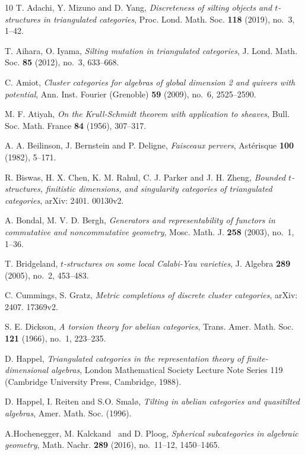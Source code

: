 \documentclass[11pt,a4paper]{amsart}
\numberwithin{equation}{section} \theoremstyle{plain}
\numberwithin{equation}{section} \theoremstyle{definition}
\begin{document}
\renewcommand\refname{\bf References}
\begin{thebibliography}{10}
T. Adachi, Y. Mizuno and D. Yang, \emph{Discreteness of silting objects and $t$-structures
in triangulated categories}, Proc. Lond. Math. Soc. \textbf{118} (2019), no.~3, 1--42.

T. Aihara, O. Iyama, \emph{Silting mutation in triangulated categories}, J. Lond. Math. Soc. \textbf{85} (2012), no.~3, 633--668.

C. Amiot, \emph{Cluster categories for algebras of global dimension 2 and quivers with potential}, Ann. Inst. Fourier (Grenoble) \textbf{59} (2009), no.~6, 2525--2590.

M. F. Atiyah, \emph{On the Krull-Schmidt theorem with application to sheaves}, Bull. Soc. Math. France \textbf{84} (1956), 307--317.

A. A. Beilinson, J. Bernstein and P. Deligne, \emph{Faisceaux pervers}, Ast\'{e}risque \textbf{100} (1982), 5--171.

R. Biswas, H. X. Chen, K. M. Rahul, C. J. Parker and J. H. Zheng, \emph{Bounded $t$-structures, finitistic dimensions, and singularity categories of triangulated categories}, arXiv: 2401. 00130v2.

A. Bondal, M. V. D. Bergh, \emph{Generators and representability of functors in commutative and noncommutative
geometry}, Mosc. Math. J. \textbf{258} (2003), no.~1, 1--36.

T. Bridgeland, \emph{$t$-structures on some local Calabi-Yau varieties}, J. Algebra \textbf{289} (2005), no.~2, 453--483.

C. Cummings, S. Gratz, \emph{Metric completions of discrete cluster categories}, arXiv: 2407. 17369v2.

S. E. Dickson, \emph{A torsion theory for abelian categories}, Trans. Amer. Math. Soc. \textbf{121} (1966), no.~1, 223--235.

D. Happel, \emph{Triangulated categories in the representation theory of finite-dimensional algebras}, London Mathematical Society Lecture Note Series 119 (Cambridge University Press, Cambridge, 1988).

D. Happel, I. Reiten and S.O. Smal{\o}, \emph{Tilting in abelian categories and quasitilted algebras}, Amer. Math. Soc. (1996).

A.Hochenegger, M. Kalckand ~and D. Ploog, \emph{Spherical subcategories in algebraic geometry}, Math. Nachr. \textbf{289} (2016), no.~11--12, 1450--1465.


\end{thebibliography}
\end{document}
